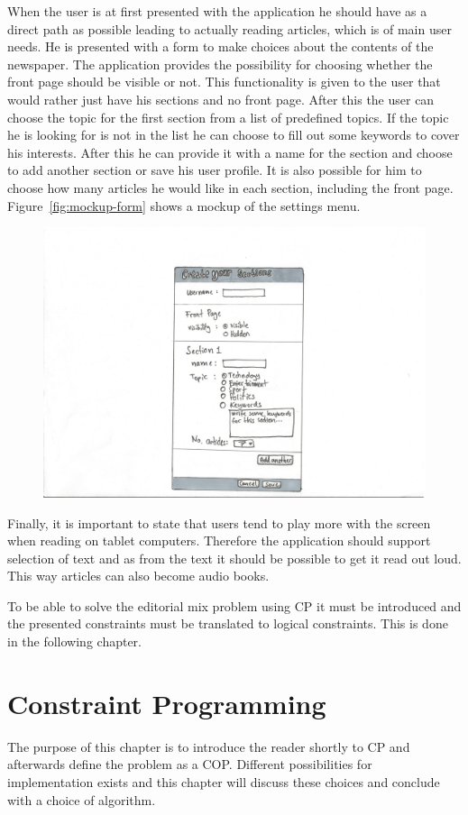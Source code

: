 When the user is at first presented with the application he should have as a direct path as possible leading to actually reading articles, which is of main user needs. He is presented with a form to make choices about the contents of the newspaper. The application provides the possibility for choosing whether the front page should be visible or not. This functionality is given to the user that would rather just have his sections and no front page. After this the user can choose the topic for the first section from a list of predefined topics. If the topic he is looking for is not in the list he can choose to fill out some keywords to cover his interests. After this he can provide it with a name for the section and choose to add another section or save his user profile. It is also possible for him to choose how many articles he would like in each section, including the front page. Figure~\vref{fig:mockup-form} shows a mockup of the settings menu.
\begin{figure}[h!tp]
	\myfloatalign
		\includegraphics[width=.45\textwidth]{img/mockup-form}
\end{figure}

Finally, it is important to state that users tend to play more with the screen when reading on tablet computers. Therefore the application should support selection of text and as from the text it should be possible to get it read out loud. This way articles can also become audio books.

To be able to solve the editorial mix problem using CP it must be introduced and the presented constraints must be translated to logical constraints. This is done in the following chapter.

\chapter{Constraint Programming}
\label{ch:design2}
The purpose of this chapter is to introduce the reader shortly to CP and afterwards define the problem as a COP. Different possibilities for implementation exists and this chapter will discuss these choices and conclude with a choice of algorithm.

